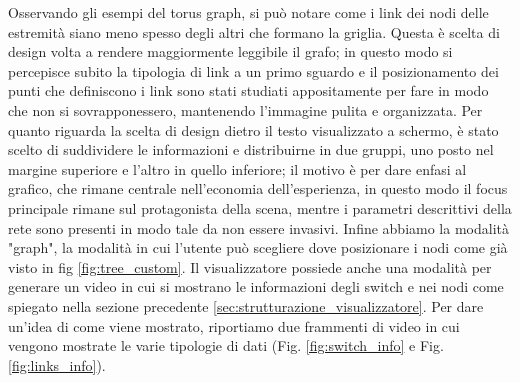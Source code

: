 \documentclass[binding=0.6cm]{sapthesis}
\begin{document}
Osservando gli esempi del torus graph, si può notare come i link dei nodi delle estremità siano meno spesso degli altri che formano la griglia.
Questa è scelta di design volta a rendere maggiormente leggibile il grafo; in questo modo si percepisce subito la tipologia di link a un primo sguardo e il
posizionamento dei punti che definiscono i link sono stati studiati appositamente per fare in modo che non si sovrapponessero, mantenendo l'immagine pulita e organizzata.
Per quanto riguarda la scelta di design dietro il testo visualizzato a schermo, è stato scelto di suddividere le informazioni e distribuirne in due gruppi, uno posto nel margine superiore e l'altro in quello inferiore;
il motivo è per dare enfasi al grafico, che rimane centrale nell'economia dell'esperienza, in questo modo il focus principale rimane sul protagonista della scena, mentre i parametri descrittivi della rete
sono presenti in modo tale da non essere invasivi.
Infine abbiamo la modalità "graph", la modalità in cui l'utente può scegliere dove posizionare i nodi come già visto in fig \ref{fig:tree_custom}.
Il visualizzatore possiede anche una modalità per generare un video in cui si mostrano le informazioni degli switch 
e nei nodi come spiegato nella sezione precedente \ref{sec:strutturazione_visualizzatore}. Per dare un'idea di come viene mostrato, riportiamo due frammenti di video in cui vengono mostrate
le varie tipologie di dati (Fig. \ref{fig:switch_info} e Fig. \ref{fig:links_info}).
\newline
\newline
\end{document}
